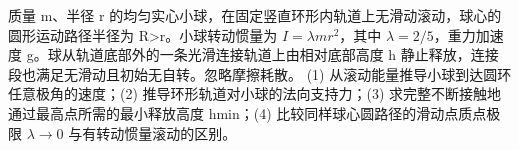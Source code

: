 质量 m、半径 r 的均匀实心小球，在固定竖直环形内轨道上无滑动滚动，球心的圆形运动路径半径为 R>r。小球转动惯量为 \(I=\lambda mr^{2}\)，其中 \(\lambda =2/5\)，重力加速度 g。球从轨道底部外的一条光滑连接轨道上由相对底部高度 h 静止释放，连接段也满足无滑动且初始无自转。忽略摩擦耗散。
(1) 从滚动能量推导小球到达圆环任意极角的速度；(2) 推导环形轨道对小球的法向支持力；(3) 求完整不断接触地通过最高点所需的最小释放高度 hmin；(4) 比较同样球心圆路径的滑动点质点极限 \(\lambda \to 0\) 与有转动惯量滚动的区别。
